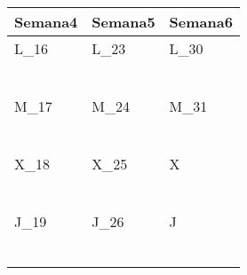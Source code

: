 	\renewcommand{\arraystretch}{1.24}\scriptsize
	\begin{longtabu} to \textwidth { X[l] X[l] X[l]}
		\centering \textbf{Semana4} &  \centering\textbf{Semana5}  &   \centering\textbf{Semana6}  \\
		\toprule
		L_{16} & L_{23} & L_{30} \\
		\makebox{$\square$}\dotfill & \makebox{$\square$}\dotfill & \makebox{$\square$}\dotfill \\
		\dotfill & \dotfill & \dotfill \\
		\makebox{$\square$}\dotfill & \makebox{$\square$}\dotfill & \makebox{$\square$}\dotfill \\
		\dotfill & \dotfill & \dotfill \\
		\makebox{$\square$}\dotfill & \makebox{$\square$}\dotfill & \makebox{$\square$}\dotfill \\
		\dotfill & \dotfill & \dotfill \\

		\hline

		M_{17} & M_{24} & M_{31} \\
		\makebox{$\square$}\dotfill & \makebox{$\square$}\dotfill & \makebox{$\square$}\dotfill \\
		\dotfill & \dotfill & \dotfill \\
		\makebox{$\square$}\dotfill & \makebox{$\square$}\dotfill & \makebox{$\square$}\dotfill \\
		\dotfill & \dotfill & \dotfill \\
		\makebox{$\square$}\dotfill & \makebox{$\square$}\dotfill & \makebox{$\square$}\dotfill \\
		\dotfill & \dotfill & \dotfill \\

		\hline

		X_{18} & X_{25} & X \\
		\makebox{$\square$}\dotfill & \makebox{$\square$}\dotfill &   \\
		\dotfill & \dotfill &   \\
		\makebox{$\square$}\dotfill & \makebox{$\square$}\dotfill &   \\
		\dotfill & \dotfill &   \\
		\makebox{$\square$}\dotfill & \makebox{$\square$}\dotfill &   \\
		\dotfill & \dotfill &   \\

		\hline

		J_{19} & J_{26} & J \\
		\makebox{$\square$}\dotfill & \makebox{$\square$}\dotfill &   \\
		\dotfill & \dotfill &   \\
		\makebox{$\square$}\dotfill & \makebox{$\square$}\dotfill &   \\
		\dotfill & \dotfill &   \\
		\makebox{$\square$}\dotfill & \makebox{$\square$}\dotfill &   \\
		\dotfill & \dotfill &   \\


\end{longtabu}
